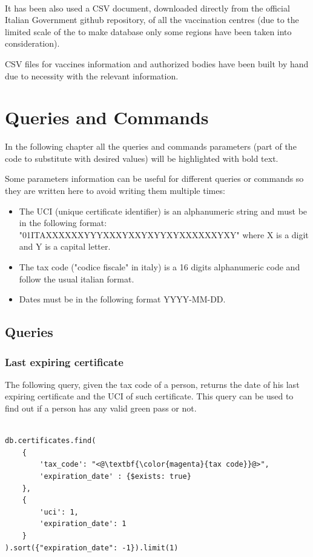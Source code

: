 \documentclass{article}
\begin{document}
\\
\hfill\break
It has been also used a CSV document, downloaded directly from the official Italian Government github repository, of all the vaccination centres (due to the limited scale of the to make database only some regions have been taken into consideration).

CSV files for vaccines information and authorized bodies have been built by hand due to necessity with the relevant information.


\newpage
\section{Queries and Commands}
In the following chapter all the queries and commands parameters (part of the code to substitute with desired values) will be highlighted with \textbf{\color{magenta}{magenta}} bold text. 

Some parameters information can be useful for different queries or commands so they are written here to avoid writing them multiple times:
\begin{itemize}
    \item The UCI (unique certificate identifier) is an alphanumeric string and must be in the following format: \\"01ITAXXXXXXYYYXXXYXXYXYYXYXXXXXXYXY" where X is a digit and Y is a capital letter.
    \item The tax code ("codice fiscale" in italy) is a 16 digits alphanumeric code and follow the usual italian format.
    \item Dates must be in the following format YYYY-MM-DD.
\end{itemize}
\subsection{Queries}
\subsubsection{Last expiring certificate}
The following query, given the tax code of a person, returns the date of his last expiring certificate and the UCI of such certificate. This query can be used to find out if a person
has any valid green pass or not.

\begin{lstlisting}[language=cypher, label=lst:cypher-example]

db.certificates.find(
    {
        'tax_code': "<@\textbf{\color{magenta}{tax code}}@>",
        'expiration_date' : {$exists: true}
    },
    {
        'uci': 1,
        'expiration_date': 1
    }
).sort({"expiration_date": -1}).limit(1)

\end{lstlisting}
\newpage
\end{document}
